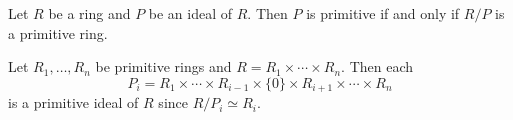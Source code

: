 \begin{exercise}
	\label{xca:primitivo}
	Let $R$ be a ring and $P$ be an ideal of $R$. Then $P$ is primitive if and only if 
	$R/P$ is a primitive ring.
\end{exercise}





\begin{example}
	Let $R_1,\dots,R_n$ be primitive rings and $R=R_1\times\cdots\times
	R_n$. Then each 
    \[
    P_i=R_1\times\cdots\times R_{i-1}\times\{0\}\times
	R_{i+1}\times\cdots\times R_n
    \]
    is a primitive ideal of $R$ since 
	$R/P_i\simeq R_i$.
\end{example}

%

